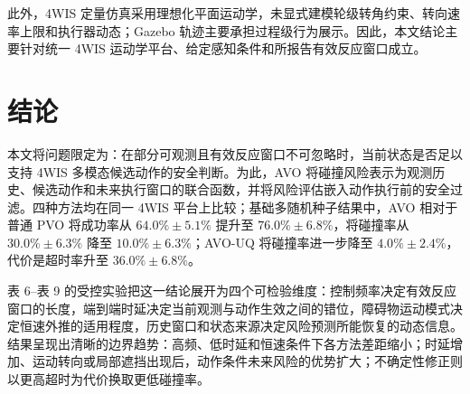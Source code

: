 \documentclass[UTF8,10pt,a4paper,twocolumn]{ctexart}
\begin{document}
此外，4WIS 定量仿真采用理想化平面运动学，未显式建模轮级转角约束、转向速率上限和执行器动态；Gazebo 轨迹主要承担过程级行为展示。因此，本文结论主要针对统一 4WIS 运动学平台、给定感知条件和所报告有效反应窗口成立。

\section{结论}

本文将问题限定为：在部分可观测且有效反应窗口不可忽略时，当前状态是否足以支持 4WIS 多模态候选动作的安全判断。为此，AVO 将碰撞风险表示为观测历史、候选动作和未来执行窗口的联合函数，并将风险评估嵌入动作执行前的安全过滤。四种方法均在同一 4WIS 平台上比较；基础多随机种子结果中，AVO 相对于普通 PVO 将成功率从 $64.0\%\pm5.1\%$ 提升至 $76.0\%\pm6.8\%$，将碰撞率从 $30.0\%\pm6.3\%$ 降至 $10.0\%\pm6.3\%$；AVO-UQ 将碰撞率进一步降至 $4.0\%\pm2.4\%$，代价是超时率升至 $36.0\%\pm6.8\%$。

表 6--表 9 的受控实验把这一结论展开为四个可检验维度：控制频率决定有效反应窗口的长度，端到端时延决定当前观测与动作生效之间的错位，障碍物运动模式决定恒速外推的适用程度，历史窗口和状态来源决定风险预测所能恢复的动态信息。结果呈现出清晰的边界趋势：高频、低时延和恒速条件下各方法差距缩小；时延增加、运动转向或局部遮挡出现后，动作条件未来风险的优势扩大；不确定性修正则以更高超时为代价换取更低碰撞率。




\end{document}
